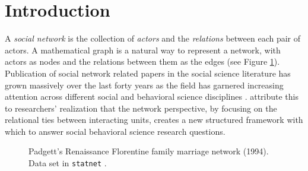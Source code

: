 \section{Introduction}

A \textit{social network} is the collection of \textit{actors} and the \textit{relations} between each pair of actors.  
A mathematical graph is a natural way to represent a network, with actors as nodes and the relations between them as the edges (see Figure \ref{fig1}).  %
Publication of social network related papers in the social science literature has grown massively over the last forty years as the field has garnered increasing attention across different social and behavioral science disciplines \citep{Knoke:2007, Carrington:2005}.  \citet{Wasserman:1994} attribute this to researchers' realization that the network perspective, by focusing on the relational ties between interacting units, creates a new structured framework with which to answer social behavioral science research questions.

\begin{figure} 
\begin{center} 
\end{center} 
\caption{Padgett's Renaissance Florentine family marriage network (1994).  Data set in \texttt{statnet} \citep{statnet:R}.} 
\label{fig1} 
\end{figure} 


